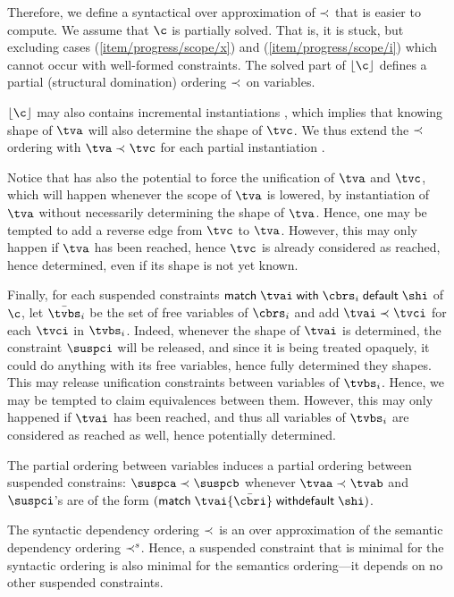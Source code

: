 Therefore, we define a syntactical over approximation of $\prec_{}$ that is
easier to compute. We assume that $\c$ is partially solved. That is, it is
stuck, but excluding cases (\ref{item/progress/scope/x}) and
(\ref{item/progress/scope/i}) which cannot occur with well-formed
constraints.  The solved part of $\cerase {\c}$ defines a partial
(structural domination) ordering $\prec_{}$ on variables.

$\cerase {\c}$ may also contains incremental instantiations
\emath{\cpapp \x \tv \tvc  \inst}, which implies that
knowing shape of $\tv$ will also determine the shape of $\tvc$.  We thus
extend the $\prec_{}$ ordering with $\tv \cprec \tvc$ for each partial
instantiation \emath{\cpapp \x \tv \tvc \inst}.

Notice that \emath{\cpapp \x \tv \tvc \inst} has also the potential to force
the unification of $\tv$ and $\tvc$, which will happen whenever the scope of
$\tv$ is lowered, \eg by instantiation of $\tv$ without necessarily
determining the shape of $\tv$.  Hence, one may be tempted to add a reverse
edge from $\tvc$ to $\tv$. However, this may only happen if $\tv$ has been
reached, hence $\tvc$ is already considered as reached, hence determined,
even if its shape is not yet known.

Finally,   for each suspended constraints $\cmatch \tvi {\cbrs_i} \cdefault
\shi$ of $\c$, let $\bar\tvbs_i$ be the set of free variables of $\cbrs_i$
and add $\tvi \cprec \tvci$ for each $\tvci$ in $\tvbs_i$.  Indeed, whenever
the shape of $\tvi$ is determined, the constraint $\suspci$ will be
released, and since it is being treated opaquely, it could do anything with
its free variables, hence fully determined they shapes.  This may release
unification constraints between variables of $\tvbs_i$. Hence, we may be
tempted to claim equivalences between them. However, this may only happened
if $\tvi$ has been reached, and thus all variables of $\tvbs_i$ are
considered as reached as well, hence potentially determined.

The partial ordering between variables induces a partial ordering between
suspended constrains: $\suspca \cprec \suspcb$ whenever $\tvaa \cprec \tvab$
and $\suspci$'s are of the form $(\cmatch \tvai {\bar\cbri} \cdefault
\shi)$.

The syntactic dependency ordering $\prec_{}$ is an over approximation of the
semantic dependency ordering $\prec_{}^s$.  Hence, a suspended constraint that
is minimal for the syntactic ordering is also minimal for the semantics
ordering---it depends on no other suspended constraints.

